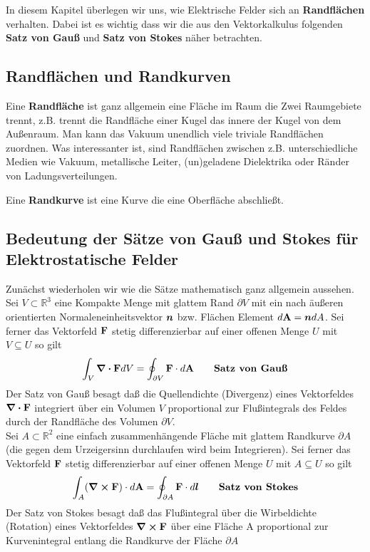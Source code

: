 In diesem Kapitel überlegen wir uns, wie Elektrische Felder sich an 
\textbf{Randflächen} verhalten. Dabei ist es wichtig dass wir die aus den
Vektorkalkulus folgenden \textbf{Satz von Gauß} und \textbf{Satz von Stokes}
näher betrachten.

\subsection{Randflächen und Randkurven}%

Eine \textbf{Randfläche} ist ganz allgemein eine Fläche im Raum die Zwei 
Raumgebiete trennt, z.B. trennt die Randfläche einer Kugel das innere der
Kugel von dem Außenraum. 
Man kann das Vakuum unendlich viele triviale Randflächen
zuordnen. Was interessanter ist, sind Randflächen zwischen z.B. 
unterschiedliche Medien wie Vakuum, metallische Leiter, (un)geladene 
Dielektrika oder Ränder von Ladungsverteilungen. 

Eine \textbf{Randkurve} ist eine Kurve die eine Oberfläche abschließt. 

\subsection{Bedeutung der Sätze von Gauß und Stokes für Elektrostatische 
Felder}%
Zunächst wiederholen wir wie die Sätze mathematisch ganz 
allgemein aussehen.\\

\noindent
Sei $V\subset \mathbb{R}^3$ eine Kompakte Menge mit glattem Rand 
$\partial V$ mit ein nach äußeren orientierten Normaleneinheitsvektor 
$\vb*n$ bzw. Flächen Element $d\vb A =  \vb*n dA$. Sei ferner das Vektorfeld
$\vb F$ stetig differenzierbar auf einer offenen Menge $U$ 
mit $V\subseteq U$ so gilt
\begin{equation}
  \int_V \div \vb FdV  = \oint_{\partial V} \vb F \cdot d\vb A 
  \qquad \textrm{\textbf{Satz von Gauß}}
\end{equation}
Der Satz von Gauß besagt daß die Quellendichte (Divergenz) eines 
Vektorfeldes $\div \vb F$
integriert über ein Volumen $V$ proportional zur Flußintegrals 
des Feldes durch der Randfläche des Volumen $\partial V$.\\

\noindent
Sei $A\subset \mathbb{R}^2$ eine einfach zusammenhängende Fläche mit
glattem Randkurve $\partial A$ (die gegen dem Urzeigersinn durchlaufen 
wird beim Integrieren). Sei ferner das Vektorfeld
$\vb F$ stetig differenzierbar auf einer offenen Menge $U$ 
mit $A\subseteq U$ so gilt
\begin{equation}
  \int_A (\curl \vb F) \cdot d\vb A= \oint_{\partial A} \vb F \cdot d\vb*l 
  \qquad \textrm{\textbf{Satz von Stokes}}
\end{equation}
Der Satz von Stokes besagt daß das Flußintegral über die Wirbeldichte 
(Rotation) eines
Vektorfeldes $\curl \vb F$ über eine Fläche A proportional zur 
Kurvenintegral entlang die Randkurve der Fläche $\partial A$


